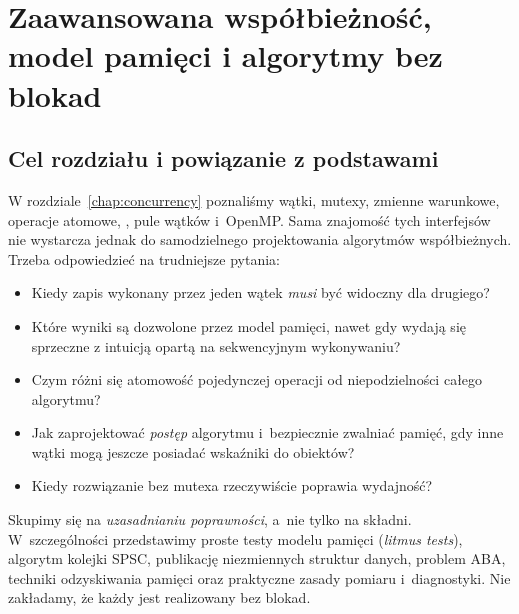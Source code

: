 
\chapter{Zaawansowana współbieżność, model pamięci i algorytmy bez blokad}
\label{chap:cpp16-advanced-concurrency}

\section{Cel rozdziału i powiązanie z podstawami}

W rozdziale~\ref{chap:concurrency} poznaliśmy wątki, mutexy, zmienne warunkowe, operacje
atomowe, , pule wątków i~OpenMP. Sama znajomość tych
interfejsów nie wystarcza jednak do samodzielnego projektowania
algorytmów współbieżnych. Trzeba odpowiedzieć na trudniejsze pytania:
\begin{itemize}
\item Kiedy zapis wykonany przez jeden wątek \emph{musi} być widoczny dla drugiego?
\item Które wyniki są dozwolone przez model pamięci, nawet gdy wydają się
      sprzeczne z intuicją opartą na sekwencyjnym wykonywaniu?
\item Czym różni się atomowość pojedynczej operacji od niepodzielności
      całego algorytmu?
\item Jak zaprojektować \emph{postęp} algorytmu i~bezpiecznie zwalniać pamięć,
      gdy inne wątki mogą jeszcze posiadać wskaźniki do obiektów?
\item Kiedy rozwiązanie bez mutexa rzeczywiście poprawia wydajność?
\end{itemize}

Skupimy się na \emph{uzasadnianiu poprawności}, a~nie tylko na składni.
W~szczególności przedstawimy proste testy modelu pamięci (\emph{litmus tests}),
algorytm kolejki SPSC, publikację niezmiennych struktur danych, problem ABA,
techniki odzyskiwania pamięci oraz praktyczne zasady pomiaru i~diagnostyki.
Nie zakładamy, że każdy  jest realizowany bez blokad.

